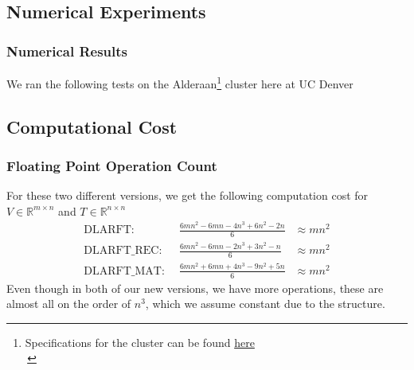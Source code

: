 \documentclass[12pt]{beamer}
\newcommand{\R}{\mathbb{R}}
\begin{document}
    \subsection{Numerical Experiments}
    \begin{frame}
        \frametitle{Numerical Results}
        We ran the following tests on the Alderaan\footnote{Specifications for the cluster can be found 
        \textcolor{blue}{\href{https://ccm-docs.readthedocs.io/en/latest/alderaan\#hardware}{here}}\\\,} 
        cluster here at UC Denver\\
        \begin{center}
        \end{center}
    \end{frame}
    \subsection{Computational Cost}
    \begin{frame}
        \frametitle{Floating Point Operation Count}
        For these two different versions, we get the following computation cost for $V\in\R^{m\times n}$ and  $T\in\R^{n\times n}$
        $$
        \begin{aligned}
            \text{DLARFT: }&\,      \frac{6mn^2 - 6mn -4n^3 +6n^2 - 2n}{6}&\approx mn^2\\
            \text{DLARFT\_REC: }&\, \frac{6mn^2 - 6mn -2n^3 +3n^2 -  n}{6}&\approx mn^2\\
            \text{DLARFT\_MAT: }&\, \frac{6mn^2 + 6mn +4n^3 -9n^2 + 5n}{6}&\approx mn^2 
        \end{aligned}
        $$
        Even though in both of our new versions, we have more operations, these are almost all on the order of $n^3$, 
        which we assume constant due to the structure.
    \end{frame}
\end{document}
